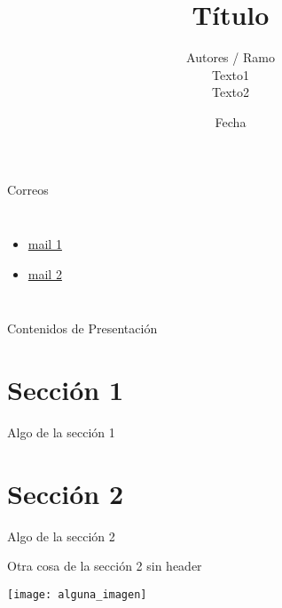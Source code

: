 \documentclass[12pt]{beamer}
\title{Título}
\author{Autores / Ramo \\
\vspace{0.1cm}
Texto1 \\
Texto2}
\date{Fecha}
\begin{document}
\begin{frame}{}
    \maketitle
\end{frame}
\begin{frame}{Correos}
\begin{columns}
\begin{itemize}
    \item \href{mailto:}{mail 1}
    \item \href{mailto:}{mail 2}

\end{itemize}

\end{columns}
\end{frame}

\begin{frame}{Contenidos de Presentación}
    \tableofcontents[] %
\end{frame}

\section{Sección 1}
\begin{frame}{Algo de la sección 1}
\vspace{5mm}
\end{frame}

\section{Sección 2}

\begin{frame}{Algo de la sección 2}
 \\

\end{frame}

\begin{frame}
Otra cosa de la sección 2 sin header
\begin{center}
\texttt{[image: alguna\_imagen]}    
\end{center}
\end{frame}
\end{document}
